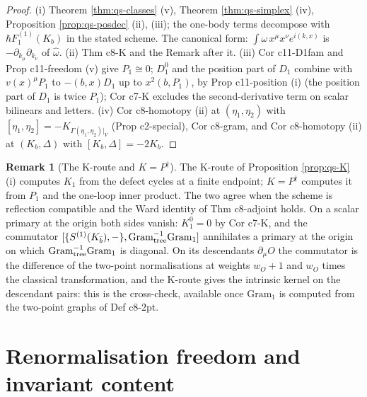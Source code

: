 \documentclass[11pt]{article}
\numberwithin{equation}{section}
\theoremstyle{plain}
\theoremstyle{definition}
\newtheorem{remark}[theorem]{Remark}
\begin{document}
\begin{proof}
(i) Theorem \ref{thm:qs-classes} (v), Theorem \ref{thm:qs-simplex} (iv), Proposition \ref{prop:qs-posdec} (ii), (iii); the one-body terms decompose with $\hbar F_1^{(1)}(K_b)$ in the stated scheme. The canonical form: $\int\omega\,x^\mu x^\nu e^{i(k,x)}$ is $-\partial_{k_\mu}\partial_{k_\nu}$ of $\hat\omega$. (ii) Thm c8-K and the Remark after it. (iii) Cor c11-D1fam and Prop c11-freedom (v) give $P_1\cong0$; $D^0_1$ and the position part of $D_1$ combine with $v(x)^\mu P_1$ to $-(b,x)D_1$ up to $x^2(b,P_1)$, by Prop c11-position (i) (the position part of $D_1$ is twice $P_1$); Cor c7-K excludes the second-derivative term on scalar bilinears and letters. (iv) Cor c8-homotopy (ii) at $(\eta_1,\eta_2)$ with $[\eta_1,\eta_2]=-K_{\Gamma(\eta_1,\eta_2)|_V}$ (Prop c2-special), Cor c8-gram, and Cor c8-homotopy (ii) at $(K_b,\Delta)$ with $[K_b,\Delta]=-2K_b$.
\end{proof}

\begin{remark}[The K-route and $K=P^\dagger$]
\label{rem:qs-KP}
The K-route of Proposition \ref{prop:qs-K} (i) computes $K_1$ from the defect cycles at a finite endpoint; $K=P^\dagger$ computes it from $P_1$ and the one-loop inner product. The two agree when the scheme is reflection compatible and the Ward identity of Thm c8-adjoint holds. On a scalar primary at the origin both sides vanish: $K^0_1=0$ by Cor c7-K, and the commutator $[\{S^{(1)}(K_{\bar b}),-\},\mathrm{Gram}_{\rm tree}^{-1}\mathrm{Gram}_1]$ annihilates a primary at the origin on which $\mathrm{Gram}_{\rm tree}^{-1}\mathrm{Gram}_1$ is diagonal. On its descendants $\partial_\mu O$ the commutator is the difference of the two-point normalisations at weights $w_O+1$ and $w_O$ times the classical transformation, and the K-route gives the intrinsic kernel on the descendant pairs: this is the cross-check, available once $\mathrm{Gram}_1$ is computed from the two-point graphs of Def c8-2pt.
\end{remark}

\section{Renormalisation freedom and invariant content}
\label{sec:qs-freedom}
\end{document}
